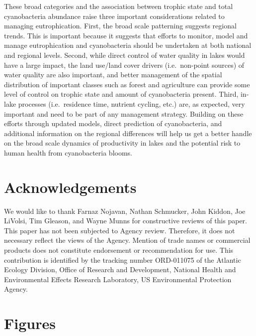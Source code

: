 \documentclass[11pt,]{article}
\begin{document}
These broad categories and the association between trophic state and
total cyanobacteria abundance raise three important considerations
related to managing eutrophication. First, the broad scale patterning
suggests regional trends. This is important because it suggests that
efforts to monitor, model and manage eutrophication and cyanobacteria
should be undertaken at both national and regional levels. Second, while
direct control of water quality in lakes would have a large impact, the
land use/land cover drivers (i.e.~non-point sources) of water quality
are also important, and better management of the spatial distribution of
important classes such as forest and agriculture can provide some level
of control on trophic state and amount of cyanobacteria present. Third,
in-lake processes (i.e.~residence time, nutrient cycling, etc.) are, as
expected, very important and need to be part of any management strategy.
Building on these efforts through updated models, direct prediction of
cyanobacteria, and additional information on the regional differences
will help us get a better handle on the broad scale dynamics of
productivity in lakes and the potential risk to human health from
cyanobacteria blooms.

\section{Acknowledgements}\label{acknowledgements}

We would like to thank Farnaz Nojavan, Nathan Schmucker, John Kiddon,
Joe LiVolsi, Tim Gleason, and Wayne Munns for constructive reviews of
this paper. This paper has not been subjected to Agency review.
Therefore, it does not necessary reflect the views of the Agency.
Mention of trade names or commercial products does not constitute
endorsement or recommendation for use. This contribution is identified
by the tracking number ORD-011075 of the Atlantic Ecology Division,
Office of Research and Development, National Health and Environmental
Effects Research Laboratory, US Environmental Protection Agency.

\newpage

\section{Figures}\label{figures}
\end{document}
